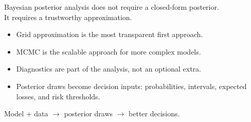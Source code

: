 \documentclass[aspectratio=43,11pt]{beamer}
\newcommand{\tightitems}{\setlength\itemsep{0.25em}}
\begin{document}
\begin{frame}{}
\begin{block}{}
Bayesian posterior analysis does not require a closed-form posterior.\\
It requires a trustworthy approximation.
\end{block}

\begin{itemize}\tightitems
  \item Grid approximation is the most transparent first approach.
  \item MCMC is the scalable approach for more complex models.
  \item Diagnostics are part of the analysis, not an optional extra.
  \item Posterior draws become decision inputs: probabilities, intervals, expected losses, and risk thresholds.
\end{itemize}

\vspace{0.45em}
\begin{center}
\large Model + data $\rightarrow$ posterior draws $\rightarrow$ better decisions.
\end{center}
\end{frame}
\end{document}
